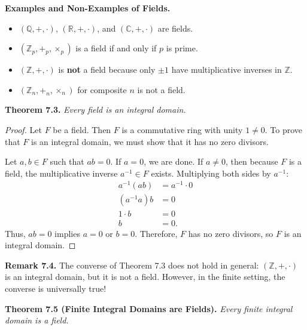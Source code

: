 \documentclass[11pt,a4paper]{article}
\begin{document}
\begin{exbox}
\textbf{Examples and Non-Examples of Fields.}
\begin{itemize}
    \item $(\mathbb{Q}, +, \cdot)$, $(\mathbb{R}, +, \cdot)$, and $(\mathbb{C}, +, \cdot)$ are fields.
    \item $(\mathbb{Z}_p, +_p, \times_p)$ is a field if and only if $p$ is prime.
    \item $(\mathbb{Z}, +, \cdot)$ is \textbf{not} a field because only $\pm 1$ have multiplicative inverses in $\mathbb{Z}$.
    \item $(\mathbb{Z}_n, +_n, \times_n)$ for composite $n$ is not a field.
\end{itemize}
\end{exbox}

\begin{thmbox}
\textbf{Theorem 7.3.} \textit{Every field is an integral domain.}
\end{thmbox}

\begin{proof}
Let $F$ be a field. Then $F$ is a commutative ring with unity $1 \ne 0$. To prove that $F$ is an integral domain, we must show that it has no zero divisors.

Let $a, b \in F$ such that $ab = 0$. If $a = 0$, we are done. If $a \ne 0$, then because $F$ is a field, the multiplicative inverse $a^{-1} \in F$ exists. Multiplying both sides by $a^{-1}$:
\begin{align*}
    a^{-1}(ab) &= a^{-1} \cdot 0 \\
    (a^{-1}a)b &= 0 \\
    1 \cdot b &= 0 \\
    b &= 0.
\end{align*}
Thus, $ab = 0$ implies $a = 0$ or $b = 0$. Therefore, $F$ has no zero divisors, so $F$ is an integral domain.
\end{proof}

\begin{rembox}
\textbf{Remark 7.4.} The converse of Theorem 7.3 does not hold in general: $(\mathbb{Z}, +, \cdot)$ is an integral domain, but it is not a field. However, in the finite setting, the converse is universally true!
\end{rembox}

\begin{thmbox}
\textbf{Theorem 7.5 (Finite Integral Domains are Fields).} \textit{Every finite integral domain is a field.}
\end{thmbox}
\end{document}
